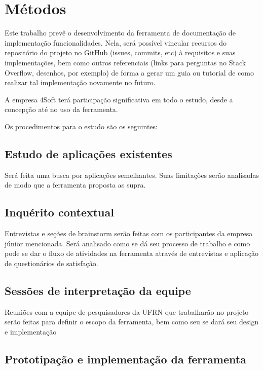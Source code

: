 \chapter{Métodos}


Este trabalho prevê o desenvolvimento da ferramenta de documentação de implementação funcionalidades. Nela, será possível vincular recursos do repositório do projeto no GitHub (issues, commits, etc) à requisitos e suas implementações, bem como outros referenciais (links para perguntas no Stack Overflow, desenhos, por exemplo) de forma a gerar um guia ou tutorial de como realizar tal implementação novamente no futuro.

A empresa 4Soft terá participação significativa em todo o estudo, desde a concepção até no uso da ferramenta.


Os procedimentos para o estudo são os seguintes:

\section {Estudo de aplicações existentes}

Será feita uma busca por aplicações semelhantes. Suas limitações serão analisadas de modo que a ferramenta proposta as supra.

\section {Inquérito contextual}

Entrevistas e seções de brainstorm serão feitas com os participantes da empresa júnior mencionada. Será analisado como se dá seu processo de trabalho e como pode se dar o fluxo de atividades na ferramenta através de entrevistas e aplicação de questionários de satisfação.

\section {Sessões de interpretação da equipe}

Reuniões com a equipe de pesquisadores da UFRN que trabalharão no projeto serão feitas para definir o escopo da ferramenta, bem como seu se dará seu design e implementação

\section {Prototipação e implementação da ferramenta}

